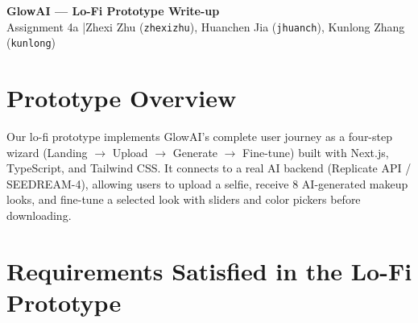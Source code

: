 \documentclass[10pt, letterpaper]{article}
\begin{document}
\begin{center}
    {\large\bfseries GlowAI --- Lo-Fi Prototype Write-up}\\[3pt]
    {\small Assignment 4a \quad|\quad Zhexi Zhu (\texttt{zhexizhu}), Huanchen Jia (\texttt{jhuanch}), Kunlong Zhang (\texttt{kunlong})}
\end{center}

\vspace{-4pt}

\section{Prototype Overview}

Our lo-fi prototype implements GlowAI's complete user journey as a four-step wizard (Landing $\rightarrow$ Upload $\rightarrow$ Generate $\rightarrow$ Fine-tune) built with Next.js, TypeScript, and Tailwind CSS. It connects to a real AI backend (Replicate API / SEEDREAM-4), allowing users to upload a selfie, receive 8 AI-generated makeup looks, and fine-tune a selected look with sliders and color pickers before downloading.

\section{Requirements Satisfied in the Lo-Fi Prototype}
\end{document}
